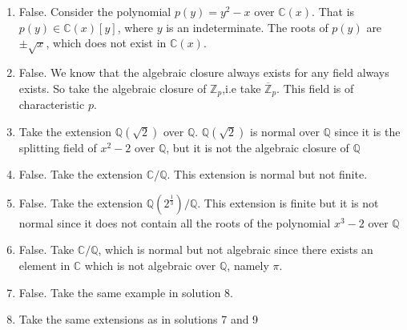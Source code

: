 \documentclass[12pt]{article}
\begin{document}
\begin{enumerate}
    \item[\bf{Soln 3: }] False. Consider the polynomial $p(y)=y^2-x$ over $\mathbb{C}(x)$. That is $p(y) \in \mathbb{C}(x)[y]$, where $y$ is an indeterminate. The roots of $p(y)$ are $\pm \sqrt{x}$, which does not exist in $\mathbb{C}(x)$. 
    \item[\bf{Soln 4: }] False. We know that the algebraic closure always exists for any field always exists. So take the algebraic closure of $\mathbb{Z}_p$,i.e take $\overline{\mathbb{Z}}_p$. This field is of characteristic $p$.
    \item[\bf{Soln 6: }] Take the extension $\mathbb{Q}(\sqrt2)$ over $\mathbb{Q}$. $\mathbb{Q}(\sqrt2)$ is normal over $\mathbb{Q}$ since it is the splitting field of $x^2-2$ over $\mathbb{Q}$, but it is not the algebraic closure of $\mathbb{Q}$
    \item[\bf{Soln 7: }] False. Take the extension $\mathbb{C}/\mathbb{Q}$. This extension is normal but not finite.
    \item[\bf{Soln 8: }] False. Take the extension $\mathbb{Q}(2^\frac{1}{3})/\mathbb{Q}$. This extension is finite but it is not normal since it does not contain all the roots of the polynomial $x^3-2$ over $\mathbb{Q}$
    \item[\bf{Soln 9: }] False. Take $\mathbb{C}/\mathbb{Q}$, which is normal but not algebraic since there exists an element in $\mathbb{C}$ which is not algebraic over $\mathbb{Q}$, namely $\pi$.
    \item[\bf{Soln 10: }] False. Take the same example in solution 8.
    \item[\bf{Soln 12: }] Take the same extensions as in solutions 7 and 9
\end{enumerate}
\end{document}
